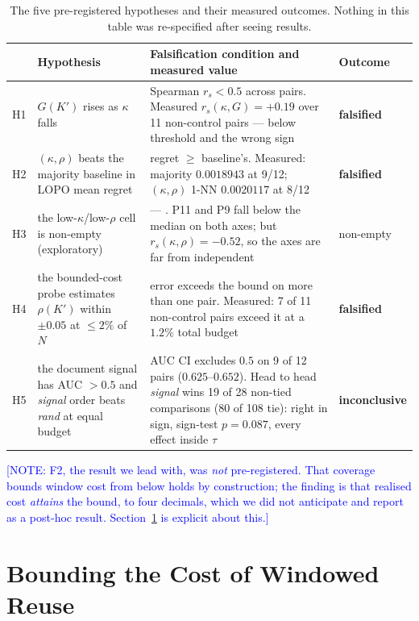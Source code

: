 \documentclass[conference]{IEEEtran}
\newcommand{\note}[1]{\textcolor{blue}{[NOTE: #1]}}
\begin{document}
\begin{table}[t]
\centering
\caption{The five pre-registered hypotheses and their measured outcomes. Nothing in this
table was re-specified after seeing results.}
\label{tab:hyp}
\small
\begin{tabular}{@{}llp{}l@{}}
\toprule
 & Hypothesis & Falsification condition and measured value & Outcome \\
\midrule
H1 & $G(K')$ rises as $\kappa$ falls & Spearman $r_s < 0.5$ across pairs. Measured $r_s(\kappa, G) = +0.19$ over 11 non-control pairs --- below threshold and the wrong sign & \textbf{falsified} \\
H2 & $(\kappa,\rho)$ beats the majority baseline in LOPO mean regret & regret $\ge$ baseline's. Measured: majority $0.0018943$ at 9/12; $(\kappa,\rho)$ 1-NN $0.0020117$ at 8/12 & \textbf{falsified} \\
H3 & the low-$\kappa$/low-$\rho$ cell is non-empty (exploratory) & --- . P11 and P9 fall below the median on both axes; but $r_s(\kappa,\rho) = -0.52$, so the axes are far from independent & non-empty \\
H4 & the bounded-cost probe estimates $\rho(K')$ within $\pm 0.05$ at $\le 2\%$ of $N$ & error exceeds the bound on more than one pair. Measured: 7 of 11 non-control pairs exceed it at a $1.2\%$ total budget & \textbf{falsified} \\
H5 & the document signal has AUC $>0.5$ and \emph{signal} order beats \emph{rand} at equal budget & AUC CI excludes $0.5$ on 9 of 12 pairs ($0.625$--$0.652$). Head to head \emph{signal} wins 19 of 28 non-tied comparisons (80 of 108 tie): right in sign, sign-test $p = 0.087$, every effect inside $\tau$ & \textbf{inconclusive} \\
\bottomrule
\end{tabular}
\end{table}

\note{F2, the result we lead with, was \emph{not} pre-registered. That coverage bounds
window cost from below holds by construction; the finding is that realised cost
\emph{attains} the bound, to four decimals, which we did not anticipate and report as a
post-hoc result. Section~\ref{sec:econ} is explicit about this.}

\section{Bounding the Cost of Windowed Reuse}\label{sec:econ}
\end{document}
